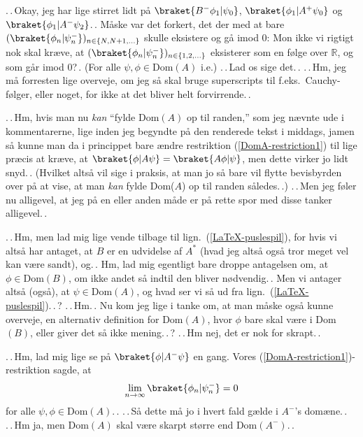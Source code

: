 \documentclass{report}
\begin{document}
.\,.\,Okay, jeg har lige stirret lidt på $\braket{B^- \phi_1 | \psi_0}$, $\braket{\phi_1 | A^+ \psi_0}$ og $\braket{\phi_1 | A^- \psi_2}$.\,. Måske var det forkert, det der med at bare $(\braket{\phi_n| \psi_n^-})_{n\in{\{N,N+1,\ldots\}}}$ skulle eksistere og gå imod 0: Mon ikke vi rigtigt nok skal kræve, at $(\braket{\phi_n| \psi_n^-})_{n\in{\{1,2,\ldots\}}}$ eksisterer som en følge over $\mathbb{R}$, og som går imod 0?\,. (For alle $\psi,\phi\in\mathrm{Dom}(A)$ i.e.) .\,.\,Lad os sige det.\,. .\,.\,Hm, jeg må forresten lige overveje, om jeg så skal bruge superscripts til f.eks.\ Cauchy-følger, eller noget, for ikke at det bliver helt forvirrende.\,. 

.\,.\,Hm, hvis man nu \emph{kan} ``fylde Dom$(A)$ op til randen,'' som jeg nævnte ude i kommentarerne, lige inden jeg begyndte på den renderede tekst i middags, jamen så kunne man da i princippet bare ændre restriktion (\ref{DomA-restriction1}) til lige præcis at kræve, at $\braket{\phi|A\psi} = \braket{A\phi|\psi}$, men dette virker jo lidt snyd.\,. (Hvilket altså vil sige i praksis, at man jo så bare vil flytte bevisbyrden over på at vise, at man \emph{kan} fylde Dom($A$) op til randen således.\,.) .\,.\,Men jeg føler nu alligevel, at jeg på en eller anden måde er på rette spor med disse tanker alligevel.\,. 

.\,.\,Hm, men lad mig lige vende tilbage til lign.\ (\ref{LaTeX-puslespil}), for hvis vi altså har antaget, at $B$ er en %
udvidelse af $A^*$ (hvad jeg altså også tror meget vel kan være sandt), og.\,. Hm, lad mig egentligt bare droppe antagelsen om, at $\phi\in\mathrm{Dom}(B)$, om ikke andet så indtil den bliver nødvendig.\,. Men vi antager altså (også), at $\psi\in\mathrm{Dom}(A)$, og hvad ser vi så ud fra lign.\ (\ref{LaTeX-puslespil}).\,.\,? .\,.\,Hm.\,. Nu kom jeg lige i tanke om, at man måske også kunne overveje, en alternativ definition for Dom$(A)$, hvor $\phi$ bare skal være i Dom$(B)$, eller giver det så ikke mening.\,.\,? .\,.\,Hm nej, det er nok for skrapt.\,. 

.\,.\,Hm, lad mig lige se på $\braket{\phi|A^- \psi}$ en gang. Vores (\ref{DomA-restriction1})-restriktion sagde, at 
\begin{align}
\begin{aligned}
		\lim_{n\to\infty}\braket{\phi_n| \psi_n^-} = 0
\end{aligned}
\end{align}
for alle $\psi,\phi\in\mathrm{Dom}(A)$.\,. .\,.\,Så dette må jo i hvert fald gælde i $A^-$'s domæne.\,. .\,.\,Hm ja, men Dom$(A)$ skal være skarpt større end Dom$(A^-)$.\,. 
\end{document}
